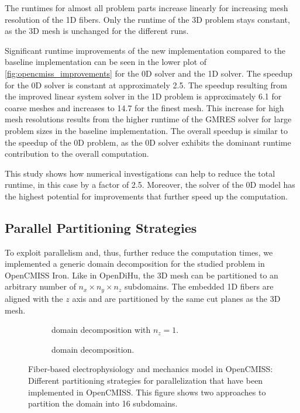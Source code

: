 The runtimes for almost all problem parts increase linearly for increasing mesh resolution of the 1D fibers. Only the runtime of the 3D problem stays constant, as the 3D mesh is unchanged for the different runs.

Significant runtime improvements of the new implementation compared to the baseline implementation can be seen in the lower plot of   \cref{fig:opencmiss_improvements} for the 0D solver and the 1D solver. The speedup for the 0D solver is constant at approximately 2.5. The speedup resulting from the improved linear system solver in the 1D problem is approximately 6.1 for coarse meshes and increases to 14.7 for the finest mesh. This increase for high mesh resolutions results from the higher runtime of the GMRES solver for large problem sizes in the baseline implementation. The overall speedup is similar to the speedup of the 0D problem, as the 0D solver exhibits the dominant runtime contribution to the overall computation.

This study shows how numerical investigations can help to reduce the total runtime, in this case by a factor of 2.5. Moreover, the solver of the 0D model has the highest potential for improvements that further speed up the computation.

\subsection{Parallel Partitioning Strategies}\label{sec:opencmiss_parallel_partitioning}

To exploit parallelism and, thus, further reduce the computation times, we implemented a generic domain decomposition for the studied problem in OpenCMISS Iron.
Like in OpenDiHu, the 3D mesh can be partitioned to an arbitrary number of $n_x \times n_y \times n_z$ subdomains. The embedded 1D fibers are aligned with the $z$ axis and are partitioned by the same cut planes as the 3D mesh.

\begin{figure}[H]
  \centering%
  \begin{subfigure}[t]{0.48\textwidth}%
    \centering%
    \def\svgwidth{0.7\textwidth}
    \caption{ domain decomposition with $n_z=1$.}%
    \label{fig:opencmiss_ddpillar}%
  \end{subfigure}
  \quad
  \begin{subfigure}[t]{0.48\textwidth}%
    \centering%
    \def\svgwidth{0.7\textwidth}
    \caption{ domain decomposition.}%
    \label{fig:opencmiss_ddcube}%
  \end{subfigure}   
  \caption{Fiber-based electrophysiology and mechanics model in OpenCMISS: Different partitioning strategies for parallelization that have been implemented in OpenCMISS. This figure shows two approaches to partition the domain into 16 subdomains.}%
  \label{fig:opencmiss_dd_annotated}%
\end{figure}%

